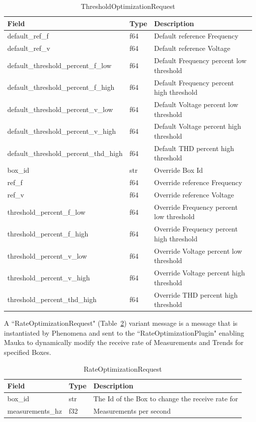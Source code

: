 \begin{table}[H]
	\centering
	\caption{ThresholdOptimizationRequest}
	\begin{tabularx}{\textwidth}{XlX}
		\toprule
		\textbf{Field} & \textbf{Type} & \textbf{Description} \\
		\midrule
		default\_ref\_f & f64 & Default reference Frequency \\
		default\_ref\_v & f64 & Default reference Voltage \\
		default\_threshold\_percent\_f\_low & f64 & Default Frequency percent low threshold \\
		default\_threshold\_percent\_f\_high & f64 & Default Frequency percent high threshold \\
		default\_threshold\_percent\_v\_low & f64 & Default Voltage percent low threshold \\
		default\_threshold\_percent\_v\_high & f64 & Default Voltage percent high threshold \\
		default\_threshold\_percent\_thd\_high & f64 & Default THD percent high threshold \\
		box\_id & str & Override Box Id \\
		ref\_f & f64 & Override reference Frequency \\
		ref\_v & f64 & Override reference Voltage \\
		threshold\_percent\_f\_low & f64 & Override Frequency percent low threshold \\
		threshold\_percent\_f\_high & f64 & Override Frequency percent high threshold \\
		threshold\_percent\_v\_low & f64 & Override Voltage percent low threshold \\
		threshold\_percent\_v\_high & f64 & Override Voltage percent high threshold \\
		threshold\_percent\_thd\_high & f64 & Override THD percent high threshold \\
		\bottomrule
	\end{tabularx}
	\label{table:ThresholdOptimziationRequest}
\end{table}

A ``RateOptimizationRequest" (Table~\ref{table:RateOptimizationRequest}) variant message is a message that is instantiated by Phenomena and sent to the ``RateOptimizationPlugin" enabling Mauka to dynamically modify the receive rate of Measurements and Trends for specified Boxes.

\begin{table}[H]
	\centering
	\caption{RateOptimizationRequest}
	\begin{tabularx}{\textwidth}{llX}
		\toprule
		\textbf{Field} & \textbf{Type} & \textbf{Description} \\
		\midrule
		box\_id & str & The Id of the Box to change the receive rate for \\
		measurements\_hz & f32 & Measurements per second \\
		\bottomrule
	\end{tabularx}
	\label{table:RateOptimizationRequest}
\end{table}

